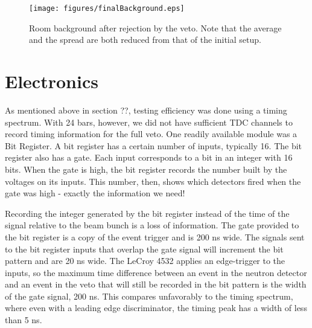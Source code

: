 \begin{figure}[htp]
\centering
\texttt{[image: figures/finalBackground.eps]}
\caption{Room background after rejection by the veto.  Note that the average and the spread are both reduced from that of the initial setup.}
\label{fig:finalBackground}
\end{figure}

\section{Electronics}

As mentioned above in section ??, testing efficiency was done using a timing spectrum.  With 24 bars, however, we did not have sufficient TDC channels to record timing information for the full veto.  One readily available module was a Bit Register.  A bit register has a certain number of inputs, typically 16.  The bit register also has a gate.  Each input corresponds to a bit in an integer with 16 bits.  When the gate is high, the bit register records the number built by the voltages on its inputs.  This number, then, shows which detectors fired when the gate was high - exactly the information we need!

Recording the integer generated by the bit register instead of the time of the signal relative to the beam bunch is a loss of information.  The gate provided to the bit register is a copy of the event trigger and is 200 ns wide.  The signals sent to the bit register inputs that overlap the gate signal will increment the bit pattern and are 20 ns wide.  The LeCroy 4532 applies an edge-trigger to the inputs, so the maximum time difference between an event in the neutron detector and an event in the veto that will still be recorded in the bit pattern is the width of the gate signal, 200 ns.  This compares unfavorably to the timing spectrum, where even with a leading edge discriminator, the timing peak has a width of less than 5 ns.

